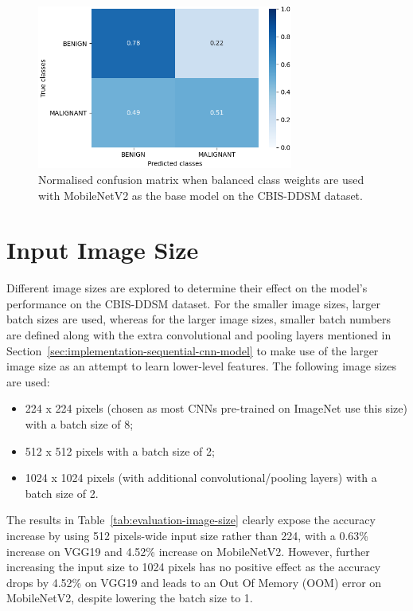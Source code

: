 \begin{figure}[h]
\centerline{\includegraphics[width=0.75\textwidth]{figures/evaluation/class_weights_experiment/balanced.png}}
\caption{\label{fig:evaluation-class_weights_experiment-balanced}Normalised confusion matrix when balanced class weights are used with MobileNetV2 as the base model on the CBIS-DDSM dataset.}
\end{figure}


\section{Input Image Size}
\label{sec:evaluation-input-image-size}

Different image sizes are explored to determine their effect on the model's performance on the CBIS-DDSM dataset. For the smaller image sizes, larger batch sizes are used, whereas for the larger image sizes, smaller batch numbers are defined along with the extra convolutional and pooling layers mentioned in Section~\ref{sec:implementation-sequential-cnn-model} to make use of the larger image size as an attempt to learn lower-level features. The following image sizes are used:
\begin{itemize}
    \item 224 x 224 pixels (chosen as most CNNs pre-trained on ImageNet use this size) with a batch size of 8;
    \item 512 x 512 pixels with a batch size of 2;
    \item 1024 x 1024 pixels (with additional convolutional/pooling layers) with a batch size of 2.
\end{itemize}



The results in Table~\ref{tab:evaluation-image-size} clearly expose the accuracy increase by using 512 pixels-wide input size rather than 224, with a 0.63\% increase on VGG19 and 4.52\% increase on MobileNetV2. However, further increasing the input size to 1024 pixels has no positive effect as the accuracy drops by 4.52\% on VGG19 and leads to an Out Of Memory (OOM) error on MobileNetV2, despite lowering the batch size to 1.\\

